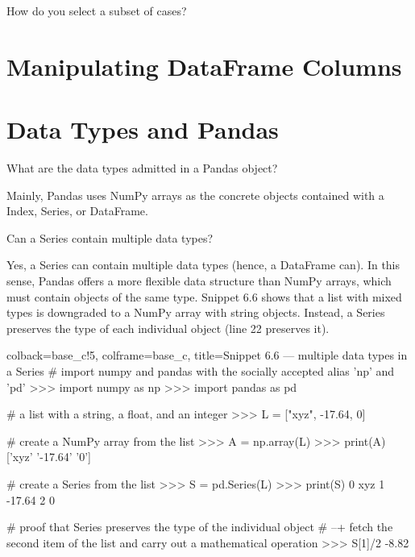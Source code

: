 \documentclass[a4paper,11pt]{book}
\numberwithin{figure}{chapter}
\numberwithin{table}{chapter}
\newcommand{\question}[1]{%
    \begin{tcolorbox}[colback=comp_c!10,colframe=comp_c,sidebyside align=top,width=\linewidth,before skip=1ex]
        #1
    \end{tcolorbox}
    \switchcolumn%
}
\newcommand{\note}[1]{%
    \begin{tcolorbox}[colback=white!0,colframe=white!10,width=\linewidth,before skip=1ex]
        #1
    \end{tcolorbox}
}
\begin{document}
\begin{paracol}{2}
	\question{\raggedright How do you select a subset of cases?}
	\note{}
\end{paracol}


\section{Manipulating DataFrame Columns}
\label{sec:manipulating_df_columns}


\section{Data Types and Pandas} 

\begin{paracol}{2}
	\question{\raggedright What are the data types admitted in a Pandas object?}
	\note{Mainly, Pandas uses NumPy arrays as the concrete objects contained with a Index, Series, or DataFrame.}
\end{paracol}

\begin{paracol}{2}
	\question{\raggedright Can a Series contain multiple data types?}
	\note{Yes, a Series can contain multiple data types (hence, a DataFrame can). In this sense, Pandas offers a more flexible data structure than NumPy arrays, which must contain objects of the same type. Snippet 6.6 shows that a list with mixed types is downgraded to a NumPy array with string objects. Instead, a Series preserves the type of each individual object (line 22 preserves it). }
\end{paracol}

\begin{pythoncode}[linenos=True]{colback=base_c!5, colframe=base_c, title=\sffamily Snippet 6.6 --- multiple data types in a Series}
# import numpy and pandas with the socially accepted alias 'np' and 'pd'
>>> import numpy as np
>>> import pandas as pd

# a list with a string, a float, and an integer
>>> L = ["xyz", -17.64, 0] 

# create a NumPy array from the list
>>> A = np.array(L)
>>> print(A)
['xyz' '-17.64' '0']

# create a Series from the list
>>> S = pd.Series(L)
>>> print(S)
0      xyz
1   -17.64
2        0

# proof that Series preserves the type of the individual object
# --+ fetch the second item of the list and carry out a mathematical operation
>>> S[1]/2
-8.82
\end{pythoncode}
\clearpage
\end{document}
